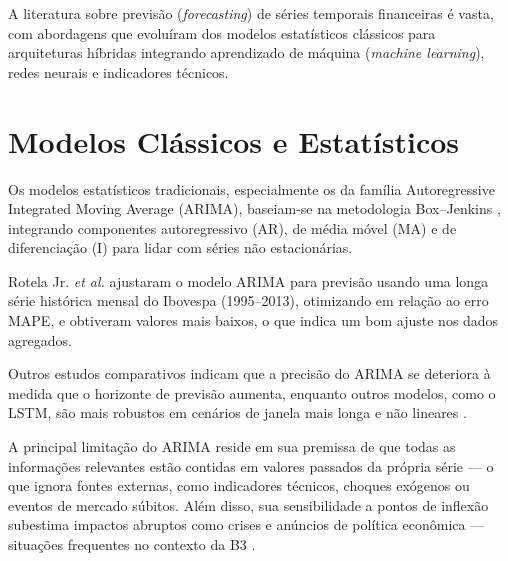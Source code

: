 


A literatura sobre previsão (\textit{forecasting}) de séries temporais financeiras é vasta, com abordagens que evoluíram dos modelos estatísticos clássicos para arquiteturas híbridas integrando aprendizado de máquina (\textit{machine learning}), redes neurais e indicadores técnicos.

\section{Modelos Clássicos e Estatísticos}

Os modelos estatísticos tradicionais, especialmente os da família Auto\-regressive Integrated Moving Average (ARIMA), baseiam‑se na metodologia Box–Jenkins \cite{box_2015}, integrando componentes autoregressivo (AR), de média móvel (MA) e de diferenciação (I) para lidar com séries não estacionárias.

Rotela Jr. \textit{et al.}\cite{rotela2014arima} ajustaram o modelo ARIMA para previsão usando uma longa série histórica mensal do Ibovespa (1995–2013), otimizando em relação ao erro MAPE, e obtiveram valores mais baixos, o que indica um bom ajuste nos dados agregados.

Outros estudos comparativos indicam que a precisão do ARIMA se deteriora à medida que o horizonte de previsão aumenta, enquanto outros modelos, como o LSTM, são mais robustos em cenários de janela mais longa e não lineares \cite{assis2022predicao}.


A principal limitação do ARIMA reside em sua premissa de que todas as informações relevantes estão contidas em valores passados da própria série — o que ignora fontes externas, como indicadores técnicos, choques exógenos ou eventos de mercado súbitos. Além disso, sua sensibilidade a pontos de inflexão subestima impactos abruptos como crises e anúncios de política econômica — situações frequentes no contexto da B3 \cite{b3_manual_negociacao}.

